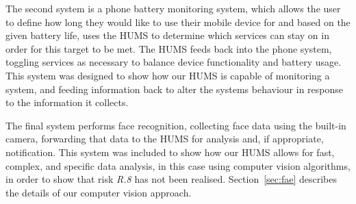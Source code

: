 \documentclass[10pt,a4paper]{article}
\begin{document}
The second system is a phone battery monitoring system, which allows the user to define how long they would like to use their mobile device for and based on the given battery life, uses the HUMS to determine which services can stay on in order for this target to be met. The HUMS feeds back into the phone system, toggling services as necessary to balance device functionality and battery usage. This system was designed to show how our HUMS is capable of monitoring a system, and feeding information back to alter the systems behaviour in response to the information it collects.

The final system performs face recognition, collecting face data using the built-in camera, forwarding that data to the HUMS for analysis and, if appropriate, notification. This system was included to show how our HUMS allows for fast, complex, and specific data analysis, in this case using computer vision algorithms, in order to show that risk \emph{R.8} has not been realised. Section~\ref{sec:fae} describes the details of our computer vision approach.
\end{document}
